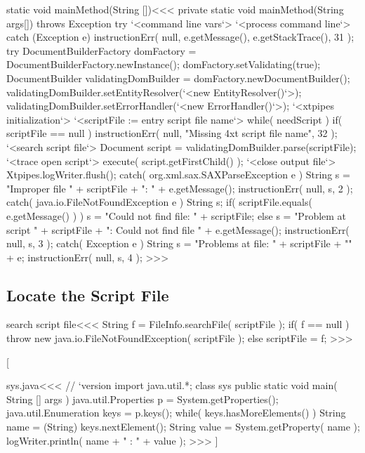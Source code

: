 \documentclass{article}
\begin{document}
{\<static void mainMethod(String [])\><<<
private static void mainMethod(String args[]) throws Exception {
  try{
    `<command line vars`>
    `<process command line`>
  } catch (Exception e){
     instructionErr( null, e.getMessage(), e.getStackTrace(), 31 );       
  }
  try {
     DocumentBuilderFactory domFactory =
           DocumentBuilderFactory.newInstance();
     domFactory.setValidating(true);
     DocumentBuilder validatingDomBuilder =
                     domFactory.newDocumentBuilder();
     validatingDomBuilder.setEntityResolver(`<new EntityResolver()`>);
     validatingDomBuilder.setErrorHandler(`<new ErrorHandler()`>);
     `<xtpipes initialization`>
     `<scriptFile := entry script file name`>
     while( needScript ){
       if( scriptFile == null ){
          instructionErr( null, "Missing 4xt script file name", 32 ); 
       }
       `<search script file`>
       Document script = validatingDomBuilder.parse(scriptFile);
       `<trace open script`>
       execute( script.getFirstChild() );
     }
     `<close output file`>
      Xtpipes.logWriter.flush();
  } catch( org.xml.sax.SAXParseException e ){ 
     String s = "Improper file " + scriptFile + ": " + e.getMessage();
     instructionErr( null, s, 2 ); 
  } catch( java.io.FileNotFoundException e ){ 
     String s;
     if( scriptFile.equals( e.getMessage() ) ){
        s =  "Could not find file: " + scriptFile;
     } else {
        s = "Problem at script " + scriptFile + ": Could not find file "
                                                     + e.getMessage();
     }
     instructionErr( null, s, 3 ); 
  } catch( Exception e ){ 
     String s = "Problems at file: " + scriptFile + "\n   " + e;
     instructionErr( null, s, 4 ); 
} } 
>>>






\subsection{Locate the Script File}




\<search script file\><<<
String f = FileInfo.searchFile( scriptFile );
if( f == null ){
   throw new java.io.FileNotFoundException( scriptFile );
} else {
   scriptFile = f;
}
>>>



[

\<sys.java\><<<
// `version
import java.util.*;
class sys{
  public static void main( String [] args ) {
     java.util.Properties p = System.getProperties();
     java.util.Enumeration keys = p.keys();
     while( keys.hasMoreElements() ) {
         String name = (String) keys.nextElement();
         String value = System.getProperty( name );
         logWriter.println( name + " : " + value );
} }  }
>>>
\EndHPage{}]


}
\end{document}
